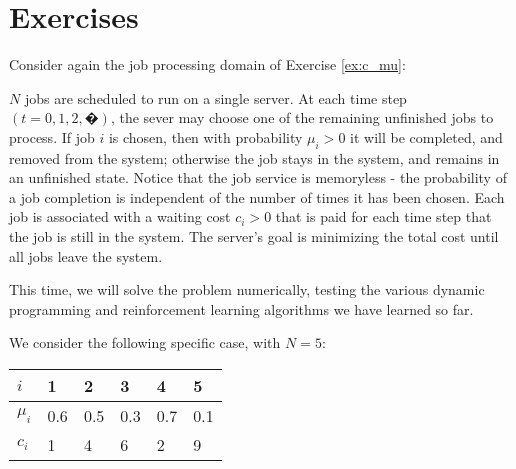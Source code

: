 \section{Exercises}

\begin{exercise}
Consider again the job processing domain of Exercise \ref{ex:c_mu}:

$N$ jobs are scheduled to run on a single server. At each time step $(t=0,1,2,�)$, the sever may choose one of the remaining unfinished jobs to process. If job $i$ is chosen, then with probability ${\mu _i} > 0$ it will be completed, and removed from the system; otherwise the job stays in the system, and remains in an unfinished state. Notice that the job service is memoryless - the probability of a job completion is independent of the number of times it has been chosen.
Each job is associated with a waiting cost ${c_i} > 0$ that is paid for each time step that the job is still in the system. The server's goal is minimizing the total cost until all jobs leave the system.

This time, we will solve the problem numerically, testing the various dynamic programming and reinforcement learning algorithms we have learned so far.

We consider the following specific case, with $N = 5$:

\begin{center}
\begin{tabular}{|l|l|l|l|l|l|}
\hline
{\bf $i$}  & {\bf 1} & {\bf 2} & {\bf 3} & {\bf 4} & {\bf 5} \\ \hline
${\mu _i}$ & 0.6     & 0.5     & 0.3     & 0.7     & 0.1     \\ \hline
${c_i}$    & 1       & 4       & 6       & 2       & 9       \\ \hline
\end{tabular}
\end{center}


\end{exercise}
